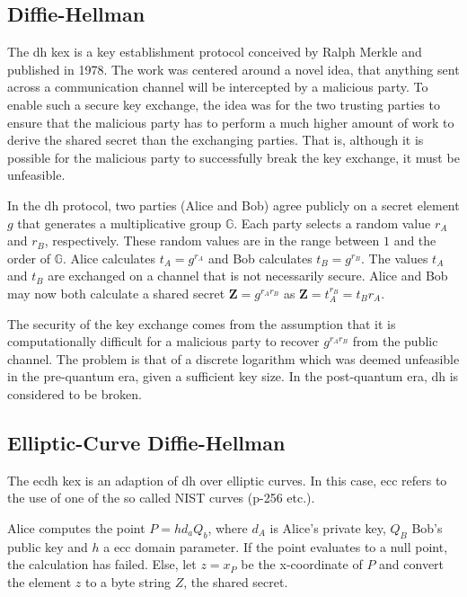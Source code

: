 \subsection{Diffie-Hellman}

The \gls{dh} \gls{kex} is a key establishment protocol conceived by Ralph Merkle and published in 1978. The work was centered around a novel idea, that anything sent across a communication channel will be intercepted by a malicious party. To enable such a secure key exchange, the idea was for the two trusting parties to ensure that the malicious party has to perform a much higher amount of work to derive the shared secret than the exchanging parties. That is, although it is possible for the malicious party to successfully break the key exchange, it must be unfeasible\cite{merkle1978}.

In the \gls{dh} protocol, two parties (Alice and Bob) agree publicly on a secret element $g$ that generates a multiplicative group $\mathbb{G}$. Each party selects a random value $r_A$ and $r_B$, respectively. These random values are in the range between $1$ and the order of $\mathbb{G}$. Alice calculates $t_A=g^{r_A}$ and Bob calculates $t_B=g^{r_B}$. The values $t_A$ and $t_B$ are exchanged on a channel that is not necessarily secure. Alice and Bob may now both calculate a shared secret $\mathbf{Z}=g^{r_A r_B}$ as $\mathbf{Z}=t_A^{r_B}=t_B{r_A}$\cite{merkle1978, boyd2020:diffie-hellman}.

The security of the key exchange comes from the assumption that it is computationally difficult for a malicious party to recover $g^{r_A r_B}$ from the public channel. The problem is that of a discrete logarithm which was deemed unfeasible in the pre-quantum era, given a sufficient key size\cite{boyd2020:diffie-hellman}. In the post-quantum era, \gls{dh} is considered to be broken\cite{bernstein2017}.

\subsection{Elliptic-Curve Diffie-Hellman}

The \gls{ecdh} \gls{kex} is an adaption of \gls{dh} over elliptic curves. In this case, \gls{ecc} refers to the use of one of the so called NIST curves (\gls{p-256} etc.)\cite{nist2018}.

Alice computes the point $P=hd_aQ_b$, where $d_A$ is Alice's private key, $Q_B$ Bob's public key and $h$ a \gls{ecc} domain parameter. If the point evaluates to a null point, the calculation has failed. Else, let $z=x_P$ be the x-coordinate of $P$ and convert the element $z$ to a byte string $Z$, the shared secret.

